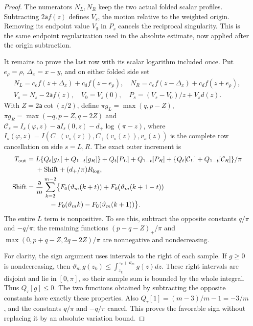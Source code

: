 \begin{proof}
The numerators $N_L,N_R$ keep the two actual folded scalar profiles.
Subtracting $2\mathsf{a}f(z)$ defines $V_s$, the motion relative to the weighted
origin. Removing its endpoint value $V_0$ in $P_s$ cancels the
reciprocal singularity. This is the same endpoint regularization used
in the absolute estimate, now applied after the origin subtraction.

It remains to prove the last row with its scalar logarithm included
once. Put $e_\rho=\rho$, $\Delta_x=x-y$, and on either folded side set
\[
 \begin{gathered}
 N_L=c_ef(z+\Delta_x)+c_df(z-e_\rho),\quad
 N_R=c_ef(z-\Delta_x)+c_df(z+e_\rho),\\
 V_s=N_s-2\mathsf{a}f(z),\quad V_0=V_s(0),
 \quad P_s=(V_s-V_0)/z+V_sd(z).
 \end{gathered}
\]
With $Z=2\mathsf{a}\cot(z/2)$, define
$\pi g_L=\max(q,p-Z)$, $\pi g_R=\max(-q,p-Z,q-2Z)$ and
$\mathcal C_s=I_s(\varphi,z)-\mathsf{a}I_s(0,z)-d_+\log(\pi-z)$,
where $I_s(\varphi,z)=I(C_-(v_s(z)),C_+(v_s(z)),v_s(z))$
is the complete row cancellation on side $s=L,R$.
The exact outer increment is
\begin{align}\label{uc:signed-outer}
 T_{\rm out}={}&L\{Q_t[g_L]+Q_{1-t}[g_R]\}
 +Q_t[P_L]+Q_{1-t}[P_R]
 +\{Q_t[\mathcal C_L]+Q_{1-t}[\mathcal C_R]\}/\pi\notag\\
 &+\mathrm{Shift}+(d_+/\pi)R_{\log},\notag\\
 \mathrm{Shift}={}&\frac {\mathsf{a}}{m}\sum_{k=2}^{m-2}
 \bigl\{F_0(\vartheta_m(k+t))+F_0(\vartheta_m(k+1-t))\notag\\
 &\qquad-F_0(\vartheta_m k)-F_0(\vartheta_m(k+1))\bigr\}.
\end{align}
The entire $L$ term is nonpositive. To see this, subtract the
opposite constants $q/\pi$ and $-q/\pi$; the remaining functions
$(p-q-Z)_+/\pi$ and $\max(0,p+q-Z,2q-2Z)/\pi$ are nonnegative
and nondecreasing.

For clarity, the sign argument uses intervals to the right of each
sample. If $g\geq0$ is nondecreasing, then
$\vartheta_m\,g(z_k)\leq\int_{z_k}^{z_k+\vartheta_m}g(z)dz$. These right intervals are
disjoint and lie in $[0,\pi]$, so their sample sum is bounded by the
whole integral. Thus $Q_\tau[g]\leq0$. The two functions obtained
by subtracting the opposite constants have exactly these properties.
Also $Q_\tau[1]=(m-3)/m-1=-3/m$, and the constants $q/\pi$
and $-q/\pi$ cancel. This proves the favorable sign without replacing
it by an absolute variation bound.


\end{proof}
